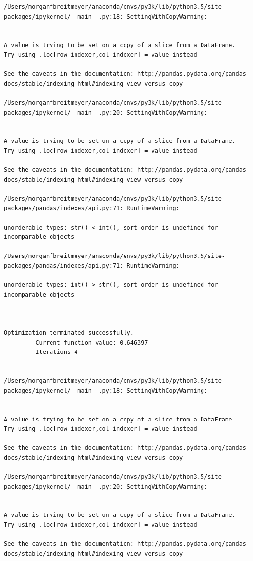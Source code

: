 \begin{lstlisting}
/Users/morganfbreitmeyer/anaconda/envs/py3k/lib/python3.5/site-packages/ipykernel/__main__.py:18: SettingWithCopyWarning:


A value is trying to be set on a copy of a slice from a DataFrame.
Try using .loc[row_indexer,col_indexer] = value instead

See the caveats in the documentation: http://pandas.pydata.org/pandas-docs/stable/indexing.html#indexing-view-versus-copy

/Users/morganfbreitmeyer/anaconda/envs/py3k/lib/python3.5/site-packages/ipykernel/__main__.py:20: SettingWithCopyWarning:


A value is trying to be set on a copy of a slice from a DataFrame.
Try using .loc[row_indexer,col_indexer] = value instead

See the caveats in the documentation: http://pandas.pydata.org/pandas-docs/stable/indexing.html#indexing-view-versus-copy

/Users/morganfbreitmeyer/anaconda/envs/py3k/lib/python3.5/site-packages/pandas/indexes/api.py:71: RuntimeWarning:

unorderable types: str() < int(), sort order is undefined for incomparable objects

/Users/morganfbreitmeyer/anaconda/envs/py3k/lib/python3.5/site-packages/pandas/indexes/api.py:71: RuntimeWarning:

unorderable types: int() > str(), sort order is undefined for incomparable objects



Optimization terminated successfully.
         Current function value: 0.646397
         Iterations 4


/Users/morganfbreitmeyer/anaconda/envs/py3k/lib/python3.5/site-packages/ipykernel/__main__.py:18: SettingWithCopyWarning:


A value is trying to be set on a copy of a slice from a DataFrame.
Try using .loc[row_indexer,col_indexer] = value instead

See the caveats in the documentation: http://pandas.pydata.org/pandas-docs/stable/indexing.html#indexing-view-versus-copy

/Users/morganfbreitmeyer/anaconda/envs/py3k/lib/python3.5/site-packages/ipykernel/__main__.py:20: SettingWithCopyWarning:


A value is trying to be set on a copy of a slice from a DataFrame.
Try using .loc[row_indexer,col_indexer] = value instead

See the caveats in the documentation: http://pandas.pydata.org/pandas-docs/stable/indexing.html#indexing-view-versus-copy


\end{lstlisting}

